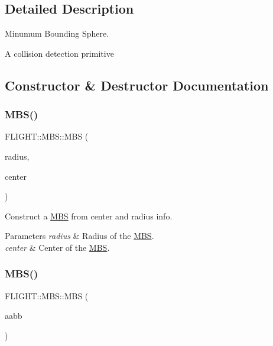 \subsection{Detailed Description}
Minumum Bounding Sphere. 

A collision detection primitive 

\subsection{Constructor \& Destructor Documentation}
\mbox{\label{class_f_l_i_g_h_t_1_1_m_b_s_a367150004a0df49b18e89af212bc8576}} 
\subsubsection{\texorpdfstring{M\+B\+S()}{MBS()}\hspace{0.1cm}{\footnotesize\ttfamily [1/2]}}
{\footnotesize\ttfamily F\+L\+I\+G\+H\+T\+::\+M\+B\+S\+::\+M\+BS (\begin{DoxyParamCaption}\item[{const float}]{radius,  }\item[{const glm\+::vec3 \&}]{center }\end{DoxyParamCaption})}



Construct a \hyperlink{class_f_l_i_g_h_t_1_1_m_b_s}{M\+BS} from center and radius info. 


\begin{DoxyParams}{Parameters}
{\em radius} & Radius of the \hyperlink{class_f_l_i_g_h_t_1_1_m_b_s}{M\+BS}. \\
\hline
{\em center} & Center of the \hyperlink{class_f_l_i_g_h_t_1_1_m_b_s}{M\+BS}. \\
\hline
\end{DoxyParams}
\mbox{\label{class_f_l_i_g_h_t_1_1_m_b_s_a2a0c036ce82df4f96002a61438eb1667}} 
\subsubsection{\texorpdfstring{M\+B\+S()}{MBS()}\hspace{0.1cm}{\footnotesize\ttfamily [2/2]}}
{\footnotesize\ttfamily F\+L\+I\+G\+H\+T\+::\+M\+B\+S\+::\+M\+BS (\begin{DoxyParamCaption}\item[{const \hyperlink{class_f_l_i_g_h_t_1_1_a_a_b_b}{A\+A\+BB} \&}]{aabb }\end{DoxyParamCaption})}



